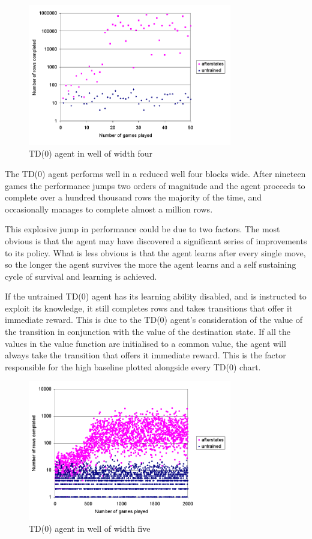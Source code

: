 \documentclass{rucsthesis}
\begin{document}
\begin{figure}[h]
\centering
\includegraphics[width=3.5in]{afterstatesredtet4well.png}
\caption{TD(0) agent in well of width four}
\label{fig:afterstatesredtet4well}
\end{figure}

The TD(0) agent performs well in a reduced well four blocks wide. After nineteen games the performance jumps two orders of magnitude and the agent proceeds to complete over a hundred thousand rows the majority of the time, and occasionally manages to complete almost a million rows.

This explosive jump in performance could be due to two factors. The most obvious is that the agent may have discovered a significant series of improvements to its policy. What is less obvious is that the agent learns after every single move, so the longer the agent survives the more the agent learns and a self sustaining cycle of survival and learning is achieved.

If the untrained TD(0) agent has its learning ability disabled, and is instructed to exploit its knowledge, it still completes rows and takes transitions that offer it immediate reward. This is due to the TD(0) agent's consideration of the value of the transition in conjunction with the value of the destination state. If all the values in the value function are initialised to a common value, the agent will always take the transition that offers it immediate reward. This is the factor responsible for the high baseline plotted alongside every TD(0) chart. 

\begin{figure}[h]
\centering
\includegraphics[width=3.5in]{afterstatesredtet5well.png}
\caption{TD(0) agent in well of width five}
\label{fig:afterstatesredtet5well}
\end{figure}
\end{document}
